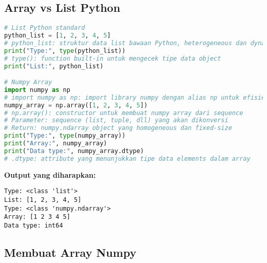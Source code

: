 \subsection*{Array vs List Python}

\begin{lstlisting}[language=python, caption={Perbedaan List Python dan Numpy Array}, style=python]
# List Python standard
python_list = [1, 2, 3, 4, 5]
# python_list: struktur data list bawaan Python, heterogeneous dan dynamic
print("Type:", type(python_list))
# type(): function built-in untuk mengecek tipe data object
print("List:", python_list)

# Numpy Array
import numpy as np
# import numpy as np: import library numpy dengan alias np untuk efisiensi penulisan
numpy_array = np.array([1, 2, 3, 4, 5])
# np.array(): constructor untuk membuat numpy array dari sequence
# Parameter: sequence (list, tuple, dll) yang akan dikonversi
# Return: numpy.ndarray object yang homogeneous dan fixed-size
print("Type:", type(numpy_array))
print("Array:", numpy_array)
print("Data type:", numpy_array.dtype)
# .dtype: attribute yang menunjukkan tipe data elements dalam array
\end{lstlisting}

\textbf{Output yang diharapkan:}
\begin{lstlisting}[style=bash]
Type: <class 'list'>
List: [1, 2, 3, 4, 5]
Type: <class 'numpy.ndarray'>
Array: [1 2 3 4 5]
Data type: int64
\end{lstlisting}

\subsection*{Membuat Array Numpy}

